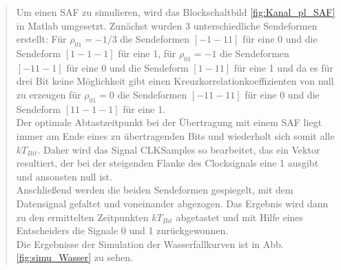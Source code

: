 \begin{quote}
       Um einen SAF zu simulieren, wird das Blockschaltbild \ref{fig:Kanal_pl_SAF} in Matlab umgesetzt. Zunächst wurden
       3 unterschiedliche Sendeformen erstellt: Für $\rho_{01}=-1/3$ die Sendeformen $[-1  -1   1]$ für eine 0 und
       die Sendeform $[1  -1  -1]$ für eine 1, für $\rho_{01}=-1$ die Sendeformen $[-1   1  -1]$ für eine 0 und
       die Sendeform $[1  -1   1]$ für eine 1 und da es für drei Bit keine Möglichkeit gibt einen
       Kreuzkorrelationkoeffizienten von null zu erzeugen für $\rho_{01}=0$ die Sendeformen $[-1  1  -1  1]$ für eine 0
       und die Sendeform $[1   1  -1  -1]$ für eine 1.\\
       Der optimale Abtastzeitpunkt bei der Übertragung mit einem SAF liegt immer am Ende eines zu übertragenden
       Bits und wiederholt sich somit alle $kT_{Bit}$. Daher wird das Signal CLKSamples so bearbeitet, das ein Vektor
       resultiert, der bei der steigenden Flanke des Clocksignals eine 1 ausgibt und ansonsten null ist.\\
       Anschließend werden die beiden Sendeformen gespiegelt, mit dem Datensignal gefaltet und voneinander abgezogen.
       Das Ergebnis wird dann zu den ermittelten Zeitpunkten $kT_{Bit}$ abgetastet und mit Hilfe eines Entscheiders die
       Signale 0 und 1 zurückgewonnen.\\
       Die Ergebnisse der Simulation der Wasserfallkurven ist in Abb. \ref{fig:simu_Wasser} zu sehen. 
  

\end{quote}
